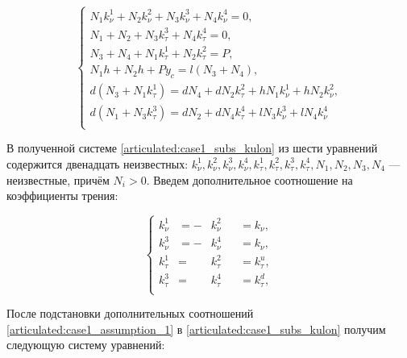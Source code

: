 \begin{equation}
\label{articulated:case1_subs_kulon}
\left\{
  \begin{alignedat}{3}  
    N_1k_\nu^1 + N_2k_\nu^2 + N_3k_\nu^3 + N_4k_\nu^4 = 0,\\
    N_1 + N_2 + N_3k_\tau^3 + N_4k_\tau^4 = 0, \\
    N_3 + N_4 + N_1k_\tau^1 + N_2k_\tau^2 = P, \\
    N_1h + N_2h + Py_c = l(N_3 + N_4), \\
    d(N_3 + N_1k_\tau^1) = dN_4 + dN_2k_\tau^2 + hN_1k_\nu^1 + hN_2k_\nu^2,\\
    d(N_1 + N_3k_\tau^3) = dN_2 + dN_4k_\tau^4 + lN_3k_\nu^3 + lN_4k_\nu^4\\
  \end{alignedat}
\right.
\end{equation}


В полученной системе \ref{articulated:case1_subs_kulon} из шести уравнений содержится двенадцать неизвестных:
$k_\nu^1, k_\nu^2, k_\nu^3, k_\nu^4, k_\tau^1, k_\tau^2, k_\tau^3, k_\tau^4, N_1, N_2, N_3, N_4$ --- неизвестные, причём $N_i>0$. Введем дополнительное соотношение на коэффициенты трения:

\begin{equation}
  \label{articulated:case1_assumption_1}
  \left\{
    \begin{alignedat}{3}
      k_\nu^1  &= -&k_\nu^2& &= k_\nu,\\
      k_\nu^3  &= -&k_\nu^4& &= k_\nu,\\
      k_\tau^1 &= &k_\tau^2& &= k_\tau^u,\\
      k_\tau^3 &= &k_\tau^4& &= k_\tau^d,\\
    \end{alignedat}
  \right.
\end{equation}

После подстановки дополнительных соотношений \ref{articulated:case1_assumption_1} в \ref{articulated:case1_subs_kulon} получим следующую систему уравнений:

